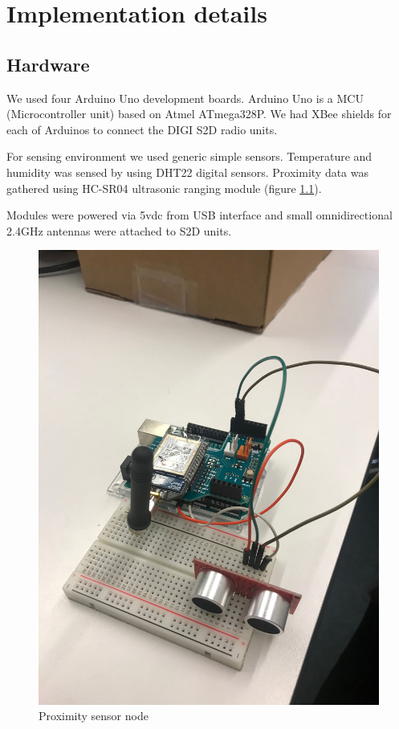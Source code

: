 \chapter{Implementation details}

\section{Hardware}
We used four Arduino Uno development boards. Arduino Uno is a MCU (Microcontroller unit) based on Atmel ATmega328P. We had XBee shields for each of Arduinos to connect the DIGI S2D radio units.

For sensing environment we used generic simple sensors. Temperature and humidity was sensed by using DHT22 digital sensors. Proximity data was gathered using HC-SR04 ultrasonic ranging module (figure \ref{fig:proximity}). 

Modules were powered via 5vdc from USB interface and small omnidirectional 2.4GHz antennas were attached to S2D units.

\begin{figure}[!htbp]
    \centering
    \includegraphics[width=\textwidth]{proximity.jpeg}
    \caption{Proximity sensor node}
    \label{fig:proximity}
\end{figure}
\FloatBarrier

